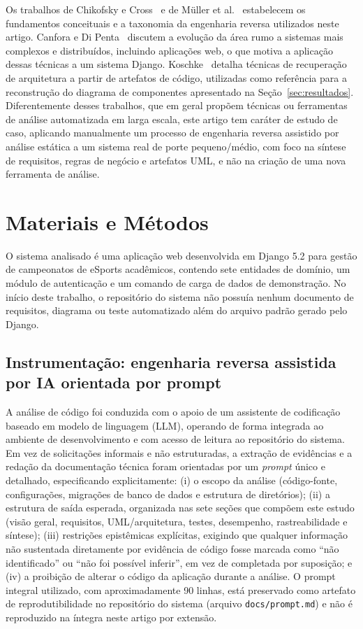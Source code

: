 \documentclass[12pt]{article}
\begin{document}
Os trabalhos de Chikofsky e Cross~\cite{chikofsky1990} e de Müller et
al.~\cite{muller2000} estabelecem os fundamentos conceituais e a taxonomia da
engenharia reversa utilizados neste artigo. Canfora e Di
Penta~\cite{canfora2007} discutem a evolução da área rumo a sistemas mais
complexos e distribuídos, incluindo aplicações web, o que motiva a aplicação
dessas técnicas a um sistema Django. Koschke~\cite{koschke2009} detalha
técnicas de recuperação de arquitetura a partir de artefatos de código,
utilizadas como referência para a reconstrução do diagrama de componentes
apresentado na Seção~\ref{sec:resultados}. Diferentemente desses trabalhos,
que em geral propõem técnicas ou ferramentas de análise automatizada em larga
escala, este artigo tem caráter de estudo de caso, aplicando manualmente um
processo de engenharia reversa assistido por análise estática a um sistema
real de porte pequeno/médio, com foco na síntese de requisitos, regras de
negócio e artefatos UML, e não na criação de uma nova ferramenta de análise.

\section{Materiais e Métodos}
\label{sec:metodo}

O sistema analisado é uma aplicação web desenvolvida em Django 5.2 para
gestão de campeonatos de eSports acadêmicos, contendo sete entidades de
domínio, um módulo de autenticação e um comando de carga de dados de
demonstração. No início deste trabalho, o repositório do sistema não possuía
nenhum documento de requisitos, diagrama ou teste automatizado além do
arquivo padrão gerado pelo Django.

\subsection{Instrumentação: engenharia reversa assistida por IA orientada por prompt}

A análise de código foi conduzida com o apoio de um assistente de
codificação baseado em modelo de linguagem (LLM), operando de forma
integrada ao ambiente de desenvolvimento e com acesso de leitura ao
repositório do sistema. Em vez de solicitações informais e não
estruturadas, a extração de evidências e a redação da documentação técnica
foram orientadas por um \emph{prompt} único e detalhado, especificando
explicitamente: (i) o escopo da análise (código-fonte, configurações,
migrações de banco de dados e estrutura de diretórios); (ii) a estrutura de
saída esperada, organizada nas sete seções que compõem este estudo (visão
geral, requisitos, UML/arquitetura, testes, desempenho, rastreabilidade e
síntese); (iii) restrições epistêmicas explícitas, exigindo que qualquer
informação não sustentada diretamente por evidência de código fosse
marcada como ``não identificado'' ou ``não foi possível inferir'', em vez
de completada por suposição; e (iv) a proibição de alterar o código da
aplicação durante a análise. O prompt integral utilizado, com
aproximadamente 90 linhas, está preservado como artefato de
reprodutibilidade no repositório do sistema (arquivo
\texttt{docs/prompt.md}) e não é reproduzido na íntegra neste artigo por
extensão.
\end{document}
